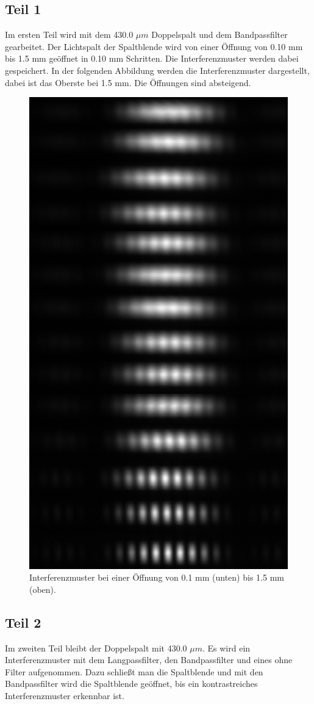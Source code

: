 \documentclass[12pt,a4paper,twoside]{article}
\begin{document}
\subsection{Teil 1}
Im ersten Teil wird mit dem 430.0 $\mu m$ Doppelspalt und dem Bandpassfilter gearbeitet. 
Der Lichtspalt der Spaltblende wird von einer Öffnung von 0.10 mm bis 1.5 mm geöffnet in 0.10 mm Schritten. Die Interferenzmuster werden dabei gespeichert. 
In der folgenden Abbildung werden die Interferenzmuster dargestellt, dabei ist das Oberste bei 1.5 mm. Die Öffnungen sind absteigend. 

\begin{figure}[H]
    \centering
    \includegraphics[width=0.6\linewidth]{nudes/aufgabe 1.jpg}
    \caption{Interferenzmuster bei einer Öffnung von 0.1 mm (unten) bis 1.5 mm (oben). }
    \label{fig:aufgabe 1}
\end{figure}

\subsection{Teil 2}
Im zweiten Teil bleibt der Doppelspalt mit 430.0 $\mu m$. Es wird ein Interferenzmuster mit dem Langpassfilter, den Bandpassfilter und eines ohne Filter aufgenommen. 
Dazu schließt man die Spaltblende und mit den Bandpassfilter wird die Spaltblende geöffnet, bis ein kontrastreiches Interferenzmuster erkennbar ist. 
\end{document}
